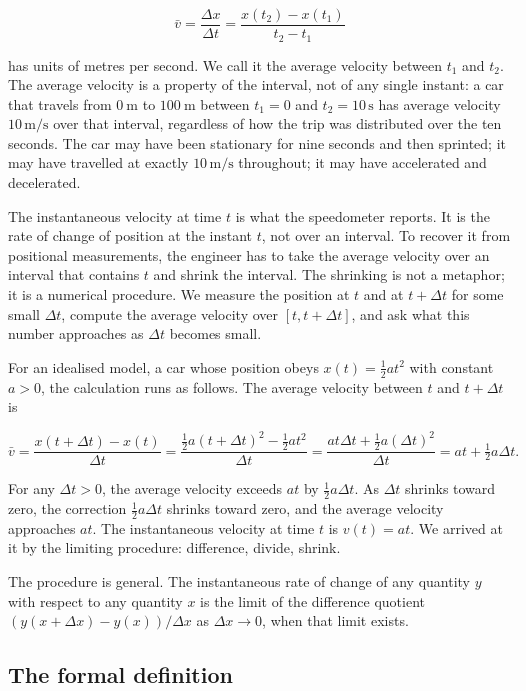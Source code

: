 \[
\bar{v} = \frac{\Delta x}{\Delta t} = \frac{x(t_{2}) - x(t_{1})}
{t_{2} - t_{1}}
\]

has units of metres per second. We call it the average velocity
between $t_{1}$ and $t_{2}$. The average velocity is a property of
the interval, not of any single instant: a car that travels from
$\SI{0}{\meter}$ to $\SI{100}{\meter}$ between $t_{1} = 0$ and
$t_{2} = 10\,\si{\second}$ has average velocity
$10\,\si{\meter\per\second}$ over that interval, regardless of how
the trip was distributed over the ten seconds. The car may have
been stationary for nine seconds and then sprinted; it may have
travelled at exactly $10\,\si{\meter\per\second}$ throughout; it
may have accelerated and decelerated.

The instantaneous velocity at time $t$ is what the speedometer
reports. It is the rate of change of position at the instant $t$,
not over an interval. To recover it from positional measurements,
the engineer has to take the average velocity over an interval that
contains $t$ and shrink the interval. The shrinking is not a
metaphor; it is a numerical procedure. We measure the position at
$t$ and at $t + \Delta t$ for some small $\Delta t$, compute the
average velocity over $[t, t + \Delta t]$, and ask what this number
approaches as $\Delta t$ becomes small.

For an idealised model, a car whose position obeys
$x(t) = \tfrac{1}{2} a t^{2}$ with constant $a > 0$, the calculation
runs as follows. The average velocity between $t$ and $t + \Delta t$
is

\[
\bar{v} = \frac{x(t + \Delta t) - x(t)}{\Delta t} =
\frac{\tfrac{1}{2} a (t + \Delta t)^{2} - \tfrac{1}{2} a t^{2}}
{\Delta t} = \frac{a t \Delta t + \tfrac{1}{2} a (\Delta t)^{2}}
{\Delta t} = a t + \tfrac{1}{2} a \Delta t.
\]

For any $\Delta t > 0$, the average velocity exceeds $a t$ by
$\tfrac{1}{2} a \Delta t$. As $\Delta t$ shrinks toward zero, the
correction $\tfrac{1}{2} a \Delta t$ shrinks toward zero, and the
average velocity approaches $a t$. The instantaneous velocity at
time $t$ is $v(t) = a t$. We arrived at it by the limiting
procedure: difference, divide, shrink.

The procedure is general. The instantaneous rate of change of any
quantity $y$ with respect to any quantity $x$ is the limit of the
difference quotient $(y(x + \Delta x) - y(x)) / \Delta x$ as
$\Delta x \to 0$, when that limit exists.

\subsection{The formal definition}

